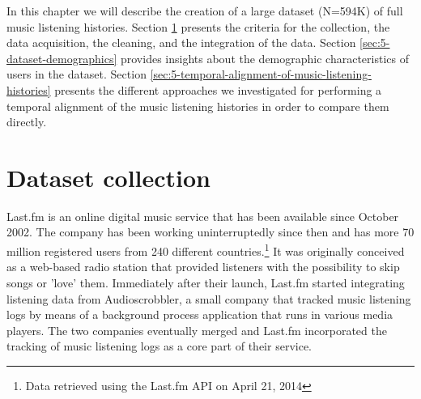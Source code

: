 




In this chapter we will describe the creation of a large dataset (N=594K) of full music listening histories. Section \ref{sec:5-dataset-collection} presents the criteria for the collection, the data acquisition, the cleaning, and the integration of the data. Section \ref{sec:5-dataset-demographics} provides insights about the demographic characteristics of users in the dataset. Section \ref{sec:5-temporal-alignment-of-music-listening-histories} presents the different approaches we investigated for performing a temporal alignment of the music listening histories in order to compare them directly.









\section{Dataset collection}\label{sec:5-dataset-collection}  %
Last.fm is an online digital music service that has been available since October 2002. The company has been working uninterruptedly since then and has more 70 million registered users from 240 different countries.\footnote{Data retrieved using the Last.fm API on April 21, 2014} 
It was originally conceived as a web-based radio station that provided listeners with the possibility to skip songs or 'love' them. Immediately after their launch, Last.fm started integrating listening data from Audioscrobbler, a small company that tracked music listening logs by means of a background process application that runs in various media players. The two companies eventually merged and Last.fm incorporated the tracking of  music listening logs as a core part of their service.

